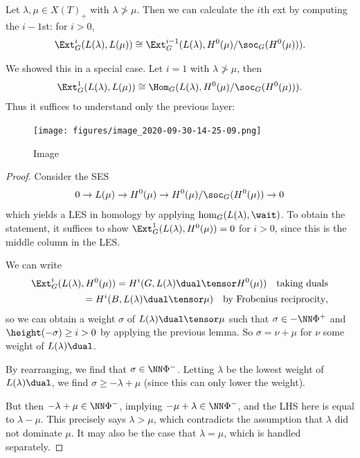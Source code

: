 \begin{proposition}[?]

Let \(\lambda, \mu \in X(T)_+\) with \(\lambda \not> \mu\). Then we can
calculate the \(i\)th ext by computing the \(i-1\)st: for \(i>0\),
\begin{align*}  
\Ext^i_G(L(\lambda), L(\mu))
\cong
\Ext^{i-1}_G(L(\lambda), H^0(\mu) / \soc_G(H^0(\mu)))
.\end{align*}

\end{proposition}

\begin{remark}

We showed this in a special case. Let \(i=1\) with
\(\lambda \not> \mu\), then
\begin{align*}  
\Ext_G^1(L(\lambda), L(\mu)) \cong
\Hom_G(L(\lambda), H^0(\mu) / \soc_G(H^0(\mu)))
.\end{align*} Thus it suffices to understand only the previous layer:

\begin{figure}
\centering
\texttt{[image: figures/image\_2020-09-30-14-25-09.png]}
\caption{Image}
\end{figure}

\end{remark}

\begin{proof}

Consider the SES
\begin{align*}  
0 \to L(\mu) \to H^0(\mu) \to H^0(\mu) / \soc_G(H^0(\mu)) \to 0
\end{align*} which yields a LES in homology by applying
\(\hom_G(L(\lambda), \wait)\). To obtain the statement, it suffices to
show \(\Ext_G^1(L(\lambda), H^0(\mu)) = 0\) for \(i>0\), since this is
the middle column in the LES.

We can write
\begin{align*}  
\Ext_G^i(L(\lambda), H^0(\mu))
=
H^i(G, L(\lambda)\dual \tensor H^0(\mu)) \quad\text{taking duals} \\
=
H^i(B, L(\lambda)\dual \tensor \mu) \quad\text{by Frobenius reciprocity}
,\end{align*} so we can obtain a weight \(\sigma\) of
\(L(\lambda)\dual \tensor \mu\) such that \(\sigma \in - \NN \Phi^+\)
and \(\height(-\sigma) \geq i > 0\) by applying the previous lemma. So
\(\sigma = \nu + \mu\) for \(\nu\) some weight of \(L(\lambda)\dual\).

By rearranging, we find that \(\sigma \in \NN \Phi^-\). Letting
\(\lambda\) be the lowest weight of \(L(\lambda)\dual\), we find
\(\sigma \geq -\lambda + \mu\) (since this can only lower the weight).

But then \(-\lambda + \mu \in \NN\Phi^-\), implying
\(-\mu + \lambda \in \NN \Phi^-\), and the LHS here is equal to
\(\lambda - \mu\). This precisely says \(\lambda > \mu\), which
contradicts the assumption that \(\lambda\) did not dominate \(\mu\). It
may also be the case that \(\lambda = \mu\), which is handled
separately.

\end{proof}

